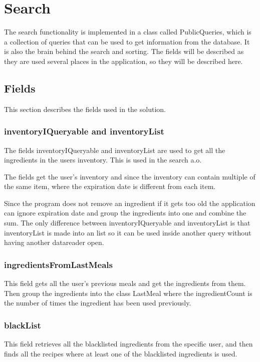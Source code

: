 \section{Search}\label{chp:PublicQuerys}
The search functionality is implemented in a class called PublicQueries, which is a collection of queries that can be used to get information from the database. It is also the brain behind the search and sorting.
The fields will be described as they are used several places in the application, so they will be described here.

\subsection{Fields}
This section describes the fields used in the solution.
\subsubsection{inventoryIQueryable and inventoryList}
The fields inventoryIQueryable and inventoryList are used to get all the ingredients in the users inventory. This is used in the search a.o.

The fields get the user's inventory and since the inventory can contain multiple of the same item, where the expiration date is different from each item.

Since the program does not remove an ingredient if it gets too old the application can ignore expiration date and group the ingredients into one and combine the sum. The only difference between inventoryIQueryable and inventoryList is that inventoryList is made into an list so it can be used inside another query without having another datareader open.

\subsubsection{ingredientsFromLastMeals}
This field gets all the user's previous meals and get the ingredients from them. Then group the ingredients into the class LastMeal where the ingredientCount is the number of times the ingredient has been used previously.

\subsubsection{blackList} \label{ssc:blacklist}

This field retrieves all the blacklisted ingredients from the specific user, and then finds all the recipes where at least one of the blacklisted ingredients is used.

